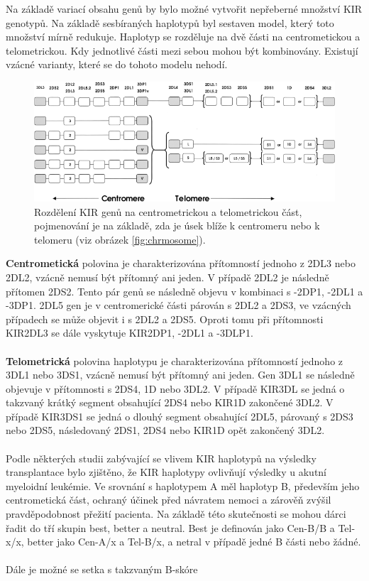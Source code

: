 \documentclass[czech,DP]{thesiskiv}
\numberwithin{equation}{section}
\begin{document}
\noindent
Na základě variací obsahu genů by bylo možné vytvořit nepřeberné množství KIR genotypů. Na základě sesbíraných haplotypů byl sestaven model, který toto množství mírně redukuje. Haplotyp se rozděluje na dvě části na centrometickou a telometrickou. Kdy jednotlivé části mezi sebou mohou být kombinovány. Existují vzácné varianty, které se do tohoto modelu nehodí. \cite{KIR_haplotypy_ct}
\begin{figure}[H]		
		\centering
		\includegraphics[width=\textwidth]{./img/KIR_haplotypy.png}
		\caption{Rozdělení KIR genů na centrometrickou a telometrickou část, pojmenování je na základě, zda je úsek blíže k centromeru nebo k telomeru (viz obrázek \ref{fig:chrmosome}). \cite{KIR_haplotypy_ct}}
		\label{fig:kir_aplotypy_ct}
\end{figure}

\noindent 
\textbf{Centrometická} polovina je charakterizována přítomností jednoho z 2DL3 nebo 2DL2, vzácně nemusí být přítomný ani jeden. V případě 2DL2 je následně přítomen 2DS2. Tento pár genů se následně objevu v kombinaci s -2DP1, -2DL1 a -3DP1. 2DL5 gen je v centromerické části párován s 2DL2 a 2DS3, ve vzácných případech se může objevit i s 2DL2 a 2DS5. Oproti tomu při přítomnosti KIR2DL3 se dále vyskytuje KIR2DP1, -2DL1 a -3DLP1.
\\
\\
\textbf{Telometrická} polovina haplotypu je charakterizována přítomností jednoho z 3DL1 nebo 3DS1, vzácně nemusí být přítomný ani jeden. Gen 3DL1 se následně objevuje v přítomnosti s 2DS4, 1D nebo 3DL2. V případě KIR3DL se jedná o takzvaný krátký segment obsahující 2DS4 nebo KIR1D zakončené 3DL2. V případě KIR3DS1 se jedná o dlouhý segment obsahující 2DL5, párovaný s 2DS3 nebo 2DS5, následovaný 2DS1, 2DS4 nebo KIR1D opět zakončený 3DL2. \cite{KIR_haplotypy_ct}
\\
\\
Podle některých studii zabývající se vlivem KIR haplotypů na výsledky transplantace bylo zjištěno, že KIR haplotypy ovlivňují výsledky u akutní myeloidní leukémie. Ve srovnání s haplotypem A měl haplotyp B, především jeho centrometická část, ochraný účinek před návratem nemoci a zárověň zvýšil pravděpodobnost přežití pacienta. Na základě této skutečnosti se mohou dárci řadit do tří skupin best, better a neutral. Best je definován jako Cen-B/B a Tel-x/x, better jako Cen-A/x a Tel-B/x, a netral v případě jedné B části nebo žádné. \cite{KIR_haplotypy}
\\
\\
Dále je možné se setka s takzvaným B-skóre
\end{document}
